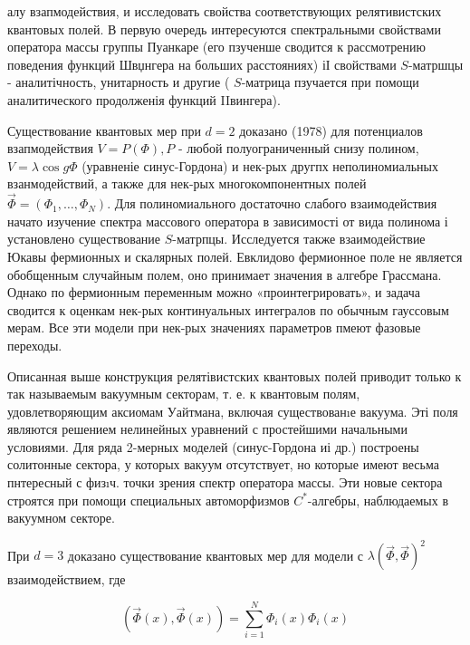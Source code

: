\documentclass[10pt]{article}
\begin{document}
алу взапмодействия, и исследовать свойства соответствующих релятивистских квантовых полей. В первую очередь интересуются спектральными свойствами оператора массы группы Пуанкаре (его пзученше сводится к рассмотрению поведения функций Швџнгера на больших расстояниях) іІ свойствами $S$-матршцы - аналитічность, унитарность и другие ( $S$-матрица пзучается при помощи аналитического продолженія функций IIвингера).



Существование квантовых мер при $d=2$ доказано (1978) для потенциалов взапмодействия $V=P(\Phi), P$ - любой полуограниченный снизу полином, $V=\lambda \cos g \Phi$ (уравненіе синус-Гордона) и нек-рых другпх неполиномиальных взанмодействий, а также для нек-рых многокомпонентных полей $\vec{\Phi}=\left(\Phi_{1}, \ldots, \Phi_{N}\right)$. Для полиномиального достаточно слабого взаимодействия начато изучение спектра массового оператора в зависимості от вида полинома і установлено существование $S$-матрпцы. Исследуется также взаимодействие Юкавы фермионных и скалярных полей. Евклидово фермионное поле не является обобщенным случайным полем, оно принимает значения в алгебре Грассмана. Однако по фермионным переменным можно «проинтегрировать», и задача сводится к оценкам нек-рых континуальных интегралов по обычным гауссовым мерам. Все эти модели при нек-рых значениях параметров пмеют фазовые переходы.



Описанная выше конструкция релятівистских квантовых полей приводит только к так называемым вакуумным секторам, т. е. к квантовым полям, удовлетворяющим аксиомам Уайтмана, включая существованıе вакуума. Эті поля являются решением нелинейных уравнений с простейшими начальными условиями. Для ряда 2-мерных моделей (синус-Гордона иі др.) построены солитонные сектора, у которых вакуум отсутствует, но которые имеют весьма пнтересный с физıч. точки зрения спектр оператора массы. Эти новые сектора строятся при помощи специальных автоморфизмов $C^{*}$-алгебры, наблюдаемых в вакуумном секторе.



При $d=3$ доказано существование квантовых мер для модели с $\lambda(\vec{\Phi}, \vec{\Phi})^{2}$ взаимодействием, где



\[

(\vec{\Phi}(x), \vec{\Phi}(x))=\sum_{i=1}^{N} \Phi_{i}(x) \Phi_{i}(x)

\]
\end{document}
